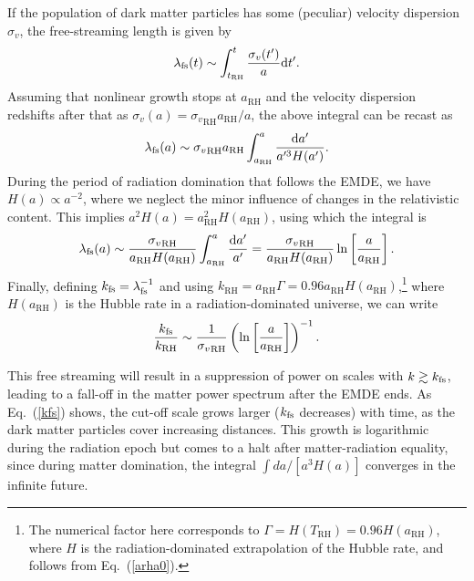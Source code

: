 \documentclass[a4paper,11pt]{article}
\newcommand{\arh}{{a}_{\mathrm{RH}}}
\newcommand{\rh}[1]{{#1}_{\mathrm{RH}}}
\newcommand{\lfs}{\lambda_{\rm fs}}
\newcommand{\kfs}{k_{\rm fs}}
\newcommand{\diff}{\ensuremath{\mathrm{d}}}
\begin{document}
If the population of dark matter particles has some (peculiar) velocity dispersion $\sigma_v$, the free-streaming length is given by \begin{equation}
    \lfs (t) \sim \int^{t}_{\rh{t}} \frac{\sigma_v(t^\prime)}{a} \diff t^\prime.
\end{equation} Assuming that nonlinear growth stops at $\rh{a}$ and the velocity dispersion redshifts after that as $\sigma_v(a) = \rh{\sigma_v} \rh{a} / a$, the above integral can be recast as \begin{equation}
    \lfs (a) \sim  \rh{\sigma_v} \rh{a}\int^{a}_{\rh{a}} \frac{\diff a^\prime}{a^{\prime 3} H(a^\prime)}. 
\end{equation} During the period of radiation domination that follows the EMDE, we have $H(a) \propto a^{-2}$, where we neglect the minor influence of changes in the relativistic content. This implies $a^2 H(a) = \rh{a}^2 H(\rh{a})$, using which the integral is \begin{equation}\label{lfs}
    \lfs (a) \sim  \frac{\rh{\sigma_v}} {\rh{a} H(\rh{a})}\int^{a}_{\rh{a}} \frac{\diff a^\prime}{a^\prime} = \frac{\rh{\sigma_v}} {\rh{a} H(\rh{a})} \ln \left[\frac{a}{\rh{a}}\right].
\end{equation} Finally, defining $\kfs = \lfs^{-1}$ and using $\rh{k} = \rh{a} \Gamma = 0.96\rh{a} H(\rh{a})$,\footnote{\label{foot:H_RH}The numerical factor here corresponds to $\Gamma=H(\rh{T})=0.96 H(\rh{a})$, where $H$ is the radiation-dominated extrapolation of the Hubble rate, and follows from Eq.~(\ref{arha0}).}
where $H(\rh{a})$ is the Hubble rate in a radiation-dominated universe, we can write \begin{equation}\label{kfs}
    \frac{\kfs}{\rh{k}} \sim \frac{1}{\rh{\sigma_v}} \left(\ln \left[\frac{a}{\arh} \right] \right)^{-1}.
\end{equation}

This free streaming will result in a suppression of power on scales with $k \gtrsim \kfs$, leading to a fall-off in the matter power spectrum after the EMDE ends. As Eq.~(\ref{kfs}) shows, the cut-off scale grows larger ($\kfs$ decreases) with time, as the dark matter particles cover increasing distances. This growth is logarithmic during the radiation epoch but comes to a halt after matter-radiation equality, since during matter domination, the integral $\int da / [a^3 H(a)]$ converges in the infinite future. 
\end{document}

